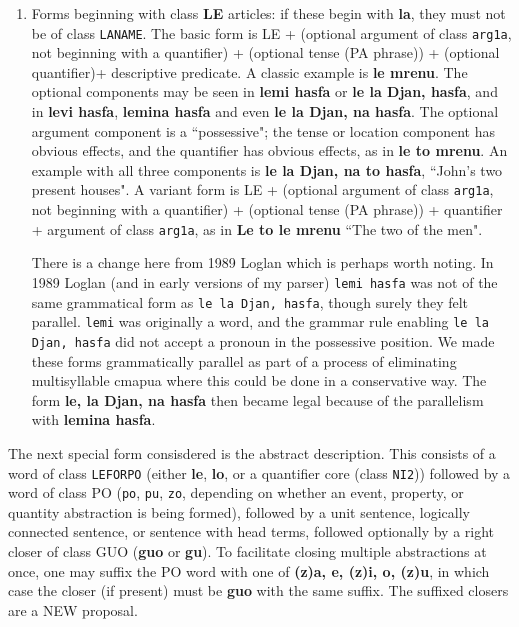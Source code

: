 \documentclass[12pt]{book}
\begin{document}
{\begin{enumerate}
\item Forms beginning with class {\bf LE} articles:  if these begin with {\bf la}, they must not be of class {\tt LANAME}.  The basic form is LE + (optional argument of class {\tt arg1a}, not beginning with a quantifier) + (optional tense (PA phrase)) + (optional quantifier)+ descriptive predicate.  A classic example is {\bf le mrenu}.  The optional components may be seen in 
{\bf lemi hasfa} or {\bf le la Djan, hasfa}, and in {\bf levi hasfa}, {\bf lemina hasfa} and even {\bf le la Djan, na hasfa}.  The optional argument component is a ``possessive";  the tense or location component has obvious effects, and the quantifier has obvious effects, as in {\bf le to mrenu}.   An example with all three components is {\bf le la Djan, na to hasfa}, ``John's two present houses".  A variant form is LE + (optional argument of class {\tt arg1a}, not beginning with a quantifier) + (optional tense (PA phrase)) + quantifier + argument of class {\tt arg1a}, as in {\bf Le to le mrenu} ``The two of the men".

There is a change here from 1989 Loglan which is perhaps worth noting.  In 1989 Loglan (and in early versions of my parser) {\tt lemi hasfa} was not of the same grammatical form as
{\tt le la Djan, hasfa}, though surely they felt parallel.  {\tt lemi} was originally a word, and the grammar rule enabling {\tt le la Djan, hasfa} did not accept a pronoun in the possessive position.  We made these forms grammatically parallel as part of a process of eliminating multisyllable cmapua where this could be done in a conservative way.  The form
{\bf le, la Djan, na hasfa} then became legal because of the parallelism with {\bf lemina hasfa}.

\end{enumerate}

The next special form consisdered is the abstract description.  This consists of a word of class {\tt LEFORPO} (either {\bf le}, {\bf lo}, or a quantifier core (class {\tt NI2})) followed by a word
of class PO ({\tt po}, {\tt pu}, {\tt zo}, depending on whether an event, property, or quantity abstraction is being formed), followed by a unit sentence, logically connected sentence, or sentence with head terms, followed optionally by a right closer of class GUO ({\bf guo} or {\bf gu}).  To facilitate closing multiple abstractions at once, one may suffix the PO word
with one of {\bf (z)a, e, (z)i, o, (z)u}, in which case the closer (if present) must be {\bf guo} with the same suffix.  The suffixed closers are a NEW proposal.

}
\end{document}
